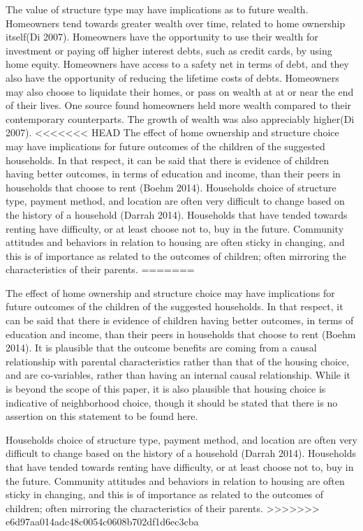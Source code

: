 \documentclass{article}
\begin{document}
	The value of structure type may have implications as to future wealth.  Homeowners tend towards greater wealth over time, related to home ownership itself(Di 2007).  Homeowners have the opportunity to use their wealth for investment or paying off higher interest debts, such as credit cards, by using home equity.  Homeowners have access to a safety net in terms of debt, and they also have the opportunity of reducing the lifetime costs of debts.  Homeowners may also choose to liquidate their homes, or pass on wealth at at or near the end of their lives.  One source found homeowners held more wealth compared to their contemporary counterparts.  The growth of wealth was also appreciably higher(Di 2007). 
<<<<<<< HEAD
The effect of home ownership and structure choice may have implications for future outcomes of the children of the suggested households.  In that respect, it can be said that there is evidence of children having better outcomes, in terms of education and income, than their peers in households that choose to rent (Boehm 2014).  Households choice of structure type, payment method, and location are often very difficult to change based on the history of a household (Darrah 2014).  Households that have tended towards renting have difficulty, or at least choose not to, buy in the future.  Community attitudes and behaviors in relation to housing are often sticky in changing, and this is of importance as related to the outcomes of children; often mirroring the characteristics of their parents.  
=======
  
The effect of home ownership and structure choice may have implications for future outcomes of the children of the suggested households.  In that respect, it can be said that there is evidence of children having better outcomes, in terms of education and income, than their peers in households that choose to rent (Boehm 2014).  It is plausible that the outcome benefits are coming from a causal relationship with parental characteristics rather than that of the housing choice, and are co-variables, rather than having an internal causal relationship.  While it is beyond the scope of this paper, it is also plausible that housing choice is indicative of neighborhood choice, though it should be stated that there is no assertion on this statement to be found here.

Households choice of structure type, payment method, and location are often very difficult to change based on the history of a household (Darrah 2014).  Households that have tended towards renting have difficulty, or at least choose not to, buy in the future.  Community attitudes and behaviors in relation to housing are often sticky in changing, and this is of importance as related to the outcomes of children; often mirroring the characteristics of their parents.  
>>>>>>> e6d97aa014adc48c0054c0608b702df1d6ec3cba
\end{document}
